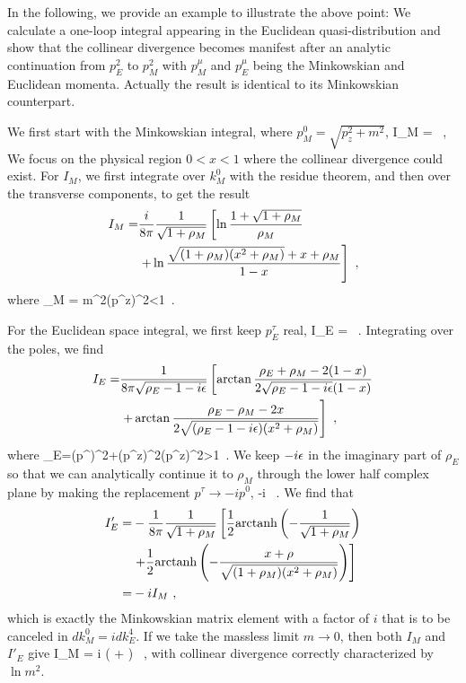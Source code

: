 In the following, we provide an example to illustrate the above point: We calculate a one-loop integral appearing in the Euclidean quasi-distribution and show that the collinear divergence becomes manifest after an analytic continuation from $p_E^2$ to $p_M^2$ with $p_M^\mu$ and $p_E^\mu$ being the Minkowskian and Euclidean momenta. Actually the result is identical to its Minkowskian counterpart.


We first start with the Minkowskian integral, where $p_M^0 = \sqrt{p_z^2+m^2}$,
\beq \label{eq:mloop}
I_M = \ ,
\eeq
We focus on the physical region $0<x<1$ where the collinear divergence could exist.
For $I_M$, we first integrate over $k_M^0$ with the residue theorem, and then over the transverse components, to get the result
\begin{align} 	\label{eq: im}
I_M =& {i\over 8\pi}{1\over \sqrt{1+\rho_M}}\left[\ln{1+\sqrt{1+\rho_M}\over \rho_M}\right.\nonumber\\
&\left. +\ln{\sqrt{(1+\rho_M)(x^2+\rho_M)}+x+\rho_M\over 1-x}\right]\ ,
\end{align}
where
\beq
\rho_M = {m^2\over (p^z)^2}<1\ .
\eeq


For the Euclidean space integral, we first keep $p^\tau_E$ real,
\beq \label{eq:eloop}
I_E =   \ .
\eeq
Integrating over the poles, we find
\begin{align}	\label{eq: ie}
I_E =& {1\over 8\pi\sqrt{\rho_E-1-i\epsilon}} \left[\arctan{\rho_E+\rho_M-2(1-x)\over2 \sqrt{\rho_E-1-i\epsilon}(1-x)} \right.\nonumber\\
&\left.+ \arctan {\rho_E-\rho_M-2x\over2 \sqrt{(\rho_E-1-i\epsilon)(x^2+\rho_M)}}\right] \ ,
\end{align}
where
\beq \label{eq: rho}
\rho_E={(p^\tau)^2+(p^z)^2\over (p^z)^2}>1\ .
\eeq
We keep $-i\epsilon$ in the imaginary part of $\rho_E$ so that we can analytically continue it to $\rho_M$ through the lower half complex plane by making the replacement $p^\tau \rightarrow -ip^0$,
\beq \label{eq: cont}
 \to -i \ .
\eeq
We find that
\begin{align} \label{eq: iecont}
I'_E =&-{1\over8\pi}{1\over \sqrt{1+\rho_M}} \left[ {1\over2}\text{arctanh}\left(- {1\over\sqrt{1+\rho_M}}\right)\right.\nonumber\\
&\left. + {1\over2}\text{arctanh}\left(-{x+\rho\over\sqrt{(1+\rho_M)(x^2+\rho_M)}}\right)\right]\nonumber\\
=& -i I_M \ ,
\end{align}
which is exactly the Minkowskian matrix element with a factor of $i$ that is to be canceled in $dk^0_M=idk^4_E$.
If we take the massless limit $m\to0$, then both $I_M$ and $I'_E$ give
\beq \label{eq: oslimit}
I_M = {i\pi} \left( +  \right) \ ,
\eeq
with collinear divergence correctly characterized by $\ln m^2$.

